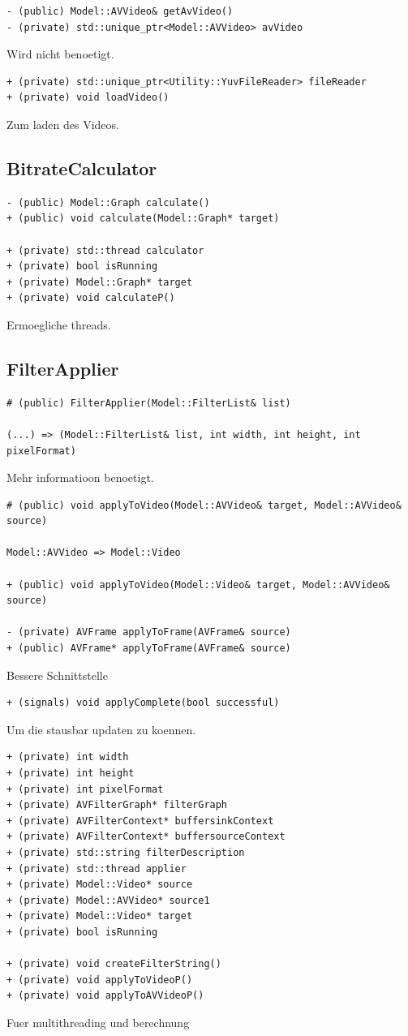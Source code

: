 \documentclass[parskip=full]{scrartcl}
\begin{document}
\begin{verbatim}
- (public) Model::AVVideo& getAvVideo()
- (private) std::unique_ptr<Model::AVVideo> avVideo
\end{verbatim}
Wird nicht benoetigt.

\begin{verbatim}
+ (private) std::unique_ptr<Utility::YuvFileReader> fileReader
+ (private) void loadVideo()
\end{verbatim}
Zum laden des Videos.
\subsection{BitrateCalculator}
\begin{verbatim}
- (public) Model::Graph calculate()
+ (public) void calculate(Model::Graph* target)

+ (private) std::thread calculator
+ (private) bool isRunning
+ (private) Model::Graph* target
+ (private) void calculateP()
\end{verbatim}
Ermoegliche threads.
\subsection{FilterApplier}
\begin{verbatim}
# (public) FilterApplier(Model::FilterList& list)

(...) => (Model::FilterList& list, int width, int height, int pixelFormat)
\end{verbatim}
Mehr informatioon benoetigt.
\begin{verbatim}
# (public) void applyToVideo(Model::AVVideo& target, Model::AVVideo& source)

Model::AVVideo => Model::Video

+ (public) void applyToVideo(Model::Video& target, Model::AVVideo& source)

- (private) AVFrame applyToFrame(AVFrame& source)
+ (public) AVFrame* applyToFrame(AVFrame& source)
\end{verbatim}
Bessere Schnittstelle
\begin{verbatim}
+ (signals) void applyComplete(bool successful)
\end{verbatim}
Um die stausbar updaten zu koennen.
\begin{verbatim}
+ (private) int width
+ (private) int height
+ (private) int pixelFormat
+ (private) AVFilterGraph* filterGraph
+ (private) AVFilterContext* buffersinkContext
+ (private) AVFilterContext* buffersourceContext
+ (private) std::string filterDescription
+ (private) std::thread applier
+ (private) Model::Video* source
+ (private) Model::AVVideo* source1
+ (private) Model::Video* target
+ (private) bool isRunning

+ (private) void createFilterString()
+ (private) void applyToVideoP()
+ (private) void applyToAVVideoP()
\end{verbatim}
Fuer multithreading und berechnung
\end{document}

